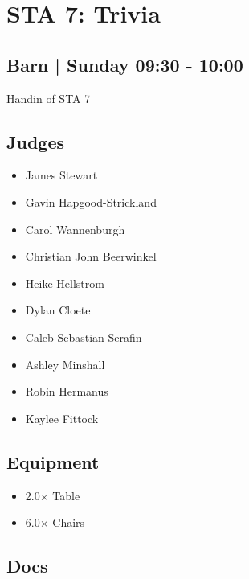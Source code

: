 \documentclass[10pt]{article}
\begin{document}
		\begin{minipage}{\linewidth}
		\setcounter{section}{34}
	\section{STA 7: Trivia }
	\subsection*{Barn | Sunday 09:30 - 10:00}

	Handin of STA 7

	\begin{multicols}{2}
	\subsection*{\faUsers \: Judges}
	\begin{itemize}
			\item James Stewart
			\item Gavin Hapgood-Strickland
			\item Carol Wannenburgh
			\item Christian John Beerwinkel
			\item Heike Hellstrom
			\item Dylan Cloete
			\item Caleb Sebastian Serafin
			\item Ashley Minshall
			\item Robin Hermanus
			\item Kaylee Fittock
		\end{itemize}
	\columnbreak
	\subsection*{\faWrench \: Equipment}
	
        \begin{itemize}
                    \item 2.0$\times$ \: Table
                    \item 6.0$\times$ \: Chairs
                \end{itemize}
                \vfill\null
        \subsection*{\faFile \: Docs}
     	\end{multicols}


	\vspace{1cm}
	\end{minipage}
\end{document}
